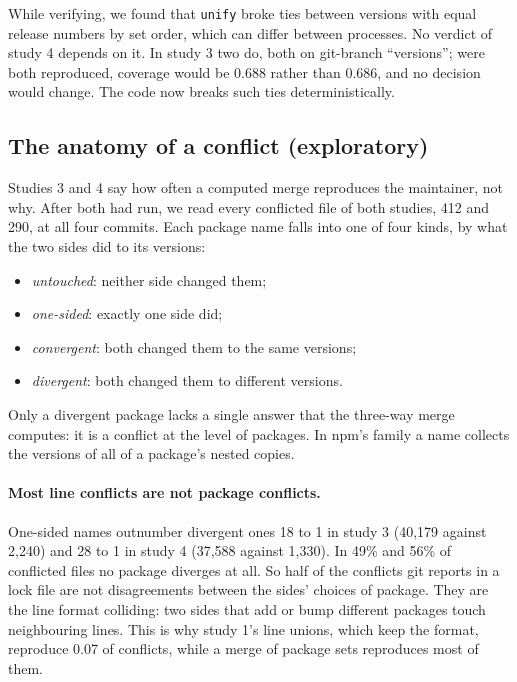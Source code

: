 \documentclass[11pt]{article}
\newcommand{\code}[1]{\texttt{#1}}
\begin{document}
While verifying, we found that \code{unify} broke ties between versions with equal release
numbers by set order, which can differ between processes. No verdict of study 4 depends on it.
In study 3 two do, both on git-branch ``versions''; were both reproduced, coverage would be 0.688
rather than 0.686, and no decision would change. The code now breaks such ties
deterministically.

\subsection{The anatomy of a conflict (exploratory)}
\label{sec:anatomy}

Studies 3 and 4 say how often a computed merge reproduces the maintainer, not why. After both
had run, we read every conflicted file of both studies, 412 and 290, at all four commits. Each
package name falls into one of four kinds, by what the two sides did to its versions:
\begin{itemize}
  \item \emph{untouched}: neither side changed them;
  \item \emph{one-sided}: exactly one side did;
  \item \emph{convergent}: both changed them to the same versions;
  \item \emph{divergent}: both changed them to different versions.
\end{itemize}
Only a divergent package lacks a single answer that the three-way merge computes: it is a
conflict at the level of packages. In npm's family a name collects the versions of all of a
package's nested copies.

\paragraph{Most line conflicts are not package conflicts.}
One-sided names outnumber divergent ones 18 to 1 in study 3 (40,179 against 2,240) and 28 to 1 in
study 4 (37,588 against 1,330). In 49\% and 56\% of conflicted files no package diverges at all.
So half of the conflicts git reports in a lock file are not disagreements between the sides'
choices of package. They are the line format colliding: two sides that add or bump different
packages touch neighbouring lines. This is why study 1's line unions, which keep the format,
reproduce 0.07 of conflicts, while a merge of package sets reproduces most of them.

\begin{table}[t]
\centering
\caption{Conflicted lock files by family and by the number of packages both sides changed to
different versions, with the share the predicted per-ecosystem merge reproduces (exploratory).}
\label{tab:anatomy}
\small

\end{table}
\end{document}
